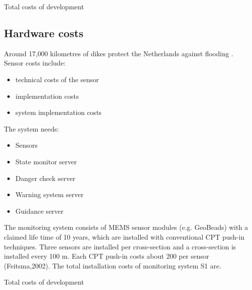 \begin{table}[H]
	\pgfplotstabletypeset[
		Costs
	]\tdevcost
\caption{Total costs of development}
\label{table:total-dev-costs}
\end{table}

\subsection{Hardware costs}
Around 17,000 kilometres of dikes protect the Netherlands against flooding \cite{DMC}. 
Sensor costs include:
\begin{itemize}
	\item technical costs of the sensor
	\item implementation costs
	\item system implementation costs
\end{itemize}

The system needs:
\begin{itemize}
	\item Sensors
	\item {State monitor server}
	\item {Danger check server}	
	\item {Warning system server}	
	\item {Guidance server}	
\end{itemize}

The monitoring system consists of MEMS sensor modules (e.g. GeoBeads) with a claimed life time of 10 years, which are installed with conventional CPT push-in techniques. Three sensors are installed per cross-section and a cross-section is installed every 100 m.
Each CPT push-in costs about \EUR{}200 per sensor (Feitsma,2002).
The total installation costs of monitoring system S1 are.

\begin{table}[H]
\caption{Total costs of development}
\label{table:total-dev-costs}
\end{table}

